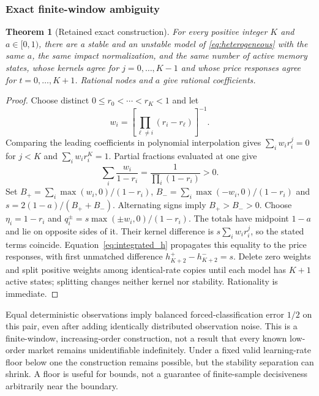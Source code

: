 \documentclass[10pt,twocolumn,letterpaper]{article}
\newtheorem{theorem}{Theorem}[section]
\theoremstyle{definition}
\theoremstyle{remark}
\begin{document}
\subsubsection{Exact finite-window ambiguity}
\begin{theorem}[Retained exact construction]
\label{thm:retained_pair}
For every positive integer $K$ and $a\in[0,1)$, there are a stable and an unstable model of \eqref{eq:heterogeneous} with the same $a$, the same impact normalization, and the same number of active memory states, whose kernels agree for $j=0,\ldots,K-1$ and whose price responses agree for $t=0,\ldots,K+1$. Rational nodes and $a$ give rational coefficients.
\end{theorem}
\begin{proof}
Choose distinct $0\le r_0<\cdots<r_K<1$ and let
\[
 w_i=\left[\prod_{\ell\ne i}(r_i-r_\ell)\right]^{-1}.
\]
Comparing the leading coefficients in polynomial interpolation gives $\sum_iw_ir_i^j=0$ for $j<K$ and $\sum_iw_ir_i^K=1$. Partial fractions evaluated at one give
\[
 \sum_i\frac{w_i}{1-r_i}=\frac{1}{\prod_i(1-r_i)}>0.
\]
Set $B_+=\sum_i\max(w_i,0)/(1-r_i)$, $B_-=\sum_i\max(-w_i,0)/(1-r_i)$ and $s=2(1-a)/(B_++B_-)$. Alternating signs imply $B_+>B_->0$. Choose $\eta_i=1-r_i$ and $q_i^\pm=s\max(\pm w_i,0)/(1-r_i)$. The totals have midpoint $1-a$ and lie on opposite sides of it. Their kernel difference is $s\sum_iw_ir_i^j$, so the stated terms coincide. Equation~\eqref{eq:integrated_h} propagates this equality to the price responses, with first unmatched difference $h^+_{K+2}-h^-_{K+2}=s$. Delete zero weights and split positive weights among identical-rate copies until each model has $K+1$ active states; splitting changes neither kernel nor stability. Rationality is immediate.
\end{proof}

Equal deterministic observations imply balanced forced-classification error $1/2$ on this pair, even after adding identically distributed observation noise. This is a finite-window, increasing-order construction, not a result that every known low-order market remains unidentifiable indefinitely. Under a fixed valid learning-rate floor below one the construction remains possible, but the stability separation can shrink. A floor is useful for bounds, not a guarantee of finite-sample decisiveness arbitrarily near the boundary.
\end{document}
